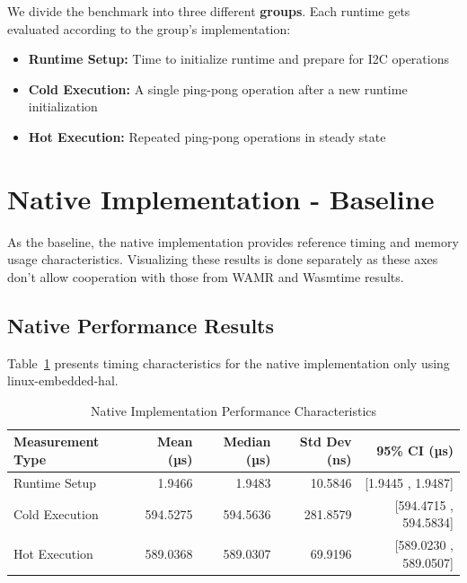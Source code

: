 We divide the benchmark into three different \textbf{groups}. Each runtime gets evaluated according to the group's implementation:
\begin{itemize}
    \item \textbf{Runtime Setup:} Time to initialize runtime and prepare for I2C operations
    \item \textbf{Cold Execution:} A single ping-pong operation after a new runtime initialization
    \item \textbf{Hot Execution:} Repeated ping-pong operations in steady state
\end{itemize}

\section{Native Implementation - Baseline}
\label{sec:native-baseline}

As the baseline, the native implementation provides reference timing and memory usage characteristics. Visualizing these results is done separately as these axes don't allow cooperation with those from WAMR and Wasmtime results.

\subsection{Native Performance Results}
\label{subsec:native-performance}

Table~\ref{tab:native-performance} presents timing characteristics for the native implementation only using linux-embedded-hal.

\begin{table}[h]
    \centering
    \caption{Native Implementation Performance Characteristics}
    \label{tab:native-performance}
    \begin{tabular}{lrrrr}
        \toprule
        \textbf{Measurement Type} & \textbf{Mean (µs)} & \textbf{Median (µs)} & \textbf{Std Dev (ns)} & \textbf{95\% CI (µs)} \\
        \midrule
        Runtime Setup    & 1.9466 & 1.9483 & 10.5846 & [1.9445 , 1.9487] \\
        Cold Execution   & 594.5275 & 594.5636 & 281.8579 & [594.4715 , 594.5834] \\
        Hot Execution    & 589.0368 & 589.0307 & 69.9196 & [589.0230 , 589.0507] \\
        \bottomrule
    \end{tabular}
\end{table}

